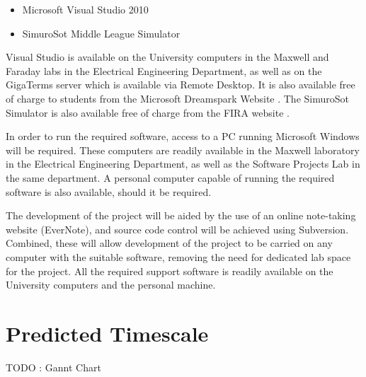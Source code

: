 \documentclass[a4paper,10pt]{article}
\begin{document}
\begin{itemize}
 \item Microsoft Visual Studio 2010
 \item SimuroSot Middle League Simulator
\end{itemize}

Visual Studio is available on the University computers in the Maxwell and Faraday labs in the Electrical Engineering Department, as well as on the GigaTerms server which is available via Remote Desktop.  It is also available free of charge to students from the Microsoft Dreamspark Website \cite{dreamsparkVS}. The SimuroSot Simulator is also available free of charge from the FIRA website \cite{simurosotSim}.

In order to run the required software, access to a PC running Microsoft Windows will be required.  These computers are readily available in the Maxwell laboratory in the Electrical Engineering Department, as well as the Software Projects Lab in the same department.  A personal computer capable of running the required software is also available, should it be required.

The development of the project will be aided by the use of an online note-taking website (EverNote), and source code control will be achieved using Subversion.  Combined, these will allow development of the project to be carried on any computer with the suitable software, removing the need for dedicated lab space for the project.  All the required support software is readily available on the University computers and the personal machine.

\section{Predicted Timescale}
TODO : Gannt Chart

\cleardoublepage

{}

\end{document}
